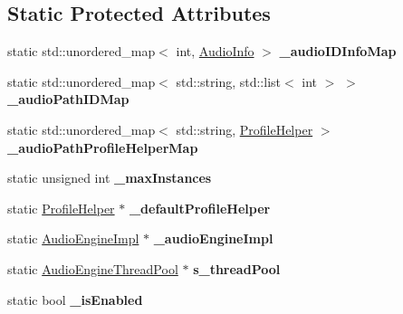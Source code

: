 \subsection*{Static Protected Attributes}
\begin{DoxyCompactItemize}
\item 
\mbox{\label{classexperimental_1_1AudioEngine_a29b2e61f10de5d7c1157dc33e2dbfae9}} 
static std\+::unordered\+\_\+map$<$ int, \hyperlink{structexperimental_1_1AudioEngine_1_1AudioInfo}{Audio\+Info} $>$ {\bfseries \+\_\+audio\+I\+D\+Info\+Map}
\item 
\mbox{\label{classexperimental_1_1AudioEngine_aff2e82aebc97877229924cb09fd5c311}} 
static std\+::unordered\+\_\+map$<$ std\+::string, std\+::list$<$ int $>$ $>$ {\bfseries \+\_\+audio\+Path\+I\+D\+Map}
\item 
\mbox{\label{classexperimental_1_1AudioEngine_a4c045099415cee265085877f1dd6c793}} 
static std\+::unordered\+\_\+map$<$ std\+::string, \hyperlink{structexperimental_1_1AudioEngine_1_1ProfileHelper}{Profile\+Helper} $>$ {\bfseries \+\_\+audio\+Path\+Profile\+Helper\+Map}
\item 
\mbox{\label{classexperimental_1_1AudioEngine_aef714998fdc8e4f0710a7da99842bf95}} 
static unsigned int {\bfseries \+\_\+max\+Instances}
\item 
\mbox{\label{classexperimental_1_1AudioEngine_ab7fe30db5072ed232b8b8013d217afad}} 
static \hyperlink{structexperimental_1_1AudioEngine_1_1ProfileHelper}{Profile\+Helper} $\ast$ {\bfseries \+\_\+default\+Profile\+Helper}
\item 
\mbox{\label{classexperimental_1_1AudioEngine_a77747934a1a64047e68df78b0de2949f}} 
static \hyperlink{classexperimental_1_1AudioEngineImpl}{Audio\+Engine\+Impl} $\ast$ {\bfseries \+\_\+audio\+Engine\+Impl}
\item 
\mbox{\label{classexperimental_1_1AudioEngine_a6670597fde9e0d8022bc264ac2b6cb9c}} 
static \hyperlink{classAudioEngineThreadPool}{Audio\+Engine\+Thread\+Pool} $\ast$ {\bfseries s\+\_\+thread\+Pool}
\item 
\mbox{\label{classexperimental_1_1AudioEngine_abff952127725b6294ad15f1414fd1622}} 
static bool {\bfseries \+\_\+is\+Enabled}
\end{DoxyCompactItemize}
